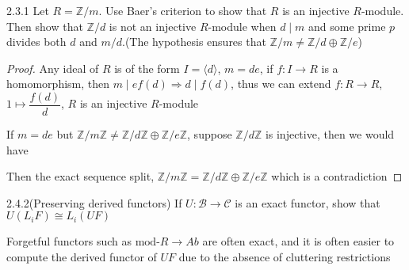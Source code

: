 \documentclass[../main.tex]{subfiles}
\begin{document}
\begin{customexercise}{2.3.1}
Let $R=\mathbb Z/m$. Use Baer's criterion to show that $R$ is an injective $R$-module. Then show that $\mathbb Z/d$ is not an injective $R$-module when $d\mid m$ and some prime $p$ divides both $d$ and $m/d$.(The hypothesis ensures that $\mathbb Z/m\neq\mathbb Z/d\oplus\mathbb Z/e$)
\end{customexercise}

\begin{proof}
Any ideal of $R$ is of the form $I=\langle d\rangle$, $m=de$, if $f:I\to R$ is a homomorphism, then $m\mid ef(d)\Rightarrow d\mid f(d)$, thus we can extend $f:R\to R$, $1\mapsto\dfrac{f(d)}{d}$, $R$ is an injective $R$-module \par
If $m=de$ but $\mathbb Z/m\mathbb Z\neq\mathbb Z/d\mathbb Z\oplus\mathbb Z/e\mathbb Z$, suppose $\mathbb Z/d\mathbb Z$ is injective, then we would have
\begin{center}
\end{center}
Then the exact sequence split, $\mathbb Z/m\mathbb Z=\mathbb Z/d\mathbb Z\oplus\mathbb Z/e\mathbb Z$ which is a contradiction
\end{proof}

\begin{customexercise}{2.4.2}(Preserving derived functors)
If $U:\mathscr B\to\mathscr C$ is an exact functor, show that $U(L_iF)\cong L_i(UF)$
\end{customexercise}

\begin{remark}
Forgetful functors such as $\mathrm{mod}$-$R\to Ab$ are often exact, and it is often easier to compute the derived functor of $UF$ due to the absence of cluttering restrictions
\end{remark}
\end{document}
